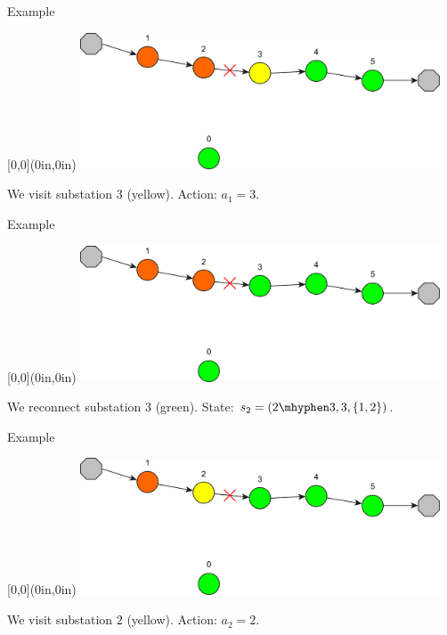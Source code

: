 \documentclass[10pt, aspectratio=169, compress, protectframetitle, handout]{beamer}
\begin{document}
\begin{frame}{Example}

    \begin{textblock*}{\textwidth}[0,0](0in,0in)
        \centering
        \includegraphics[width=0.8\textwidth]{figures/MDP_3.pdf}
    \end{textblock*}
    
    \vspace*{5cm}
    We visit substation $3$ (yellow). Action: $a_1 = 3$.
    
\end{frame}

\begin{frame}{Example}

    \begin{textblock*}{\textwidth}[0,0](0in,0in)
        \centering
        \includegraphics[width=0.8\textwidth]{figures/MDP_4.pdf}
    \end{textblock*}
    
    \vspace*{5cm}
    We reconnect substation $3$ (green). State: $s_2 = (2 \mhyphen 3, 3, \{1,2\})$.
    
\end{frame}

\begin{frame}{Example}

    \begin{textblock*}{\textwidth}[0,0](0in,0in)
        \centering
        \includegraphics[width=0.8\textwidth]{figures/MDP_5.pdf}
    \end{textblock*}
    
    \vspace*{5cm}
    We visit substation $2$ (yellow). Action: $a_2 = 2$.
    
\end{frame}
\end{document}

